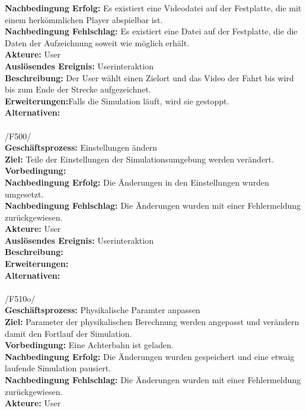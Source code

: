 \textbf{Nachbedingung Erfolg:} Es existiert eine Videodatei auf der Festplatte, die mit einem herkömmlichen Player abspielbar ist.\\
\textbf{Nachbedingung Fehlschlag:} Es existiert eine Datei auf der Festplatte, die die Daten der Aufzeichnung soweit wie möglich erhält.\\
\textbf{Akteure:} User\\
\textbf{Auslösendes Ereignis:} Userinteraktion\\
\textbf{Beschreibung:}  Der User wählt einen Zielort und das Video der Fahrt bis wird bis zum Ende der Strecke aufgezeichnet.\\
\textbf{Erweiterungen:}Falls die Simulation läuft, wird sie gestoppt.\\ 
\textbf{Alternativen:}\\
\\
/F500/\\
\textbf{Geschäftsprozess:} Einstellungen ändern\\
\textbf{Ziel:} Teile der Einstellungen der Simulationsumgebung werden verändert.\\
\textbf{Vorbedingung:} \\
\textbf{Nachbedingung Erfolg:} Die Änderungen in den Einstellungen wurden umgesetzt.\\
\textbf{Nachbedingung Fehlschlag:}  Die Änderungen wurden mit einer Fehlermeldung zurückgewiesen.\\
\textbf{Akteure:} User\\
\textbf{Auslösendes Ereignis:} Userinteraktion\\
\textbf{Beschreibung:} \\
\textbf{Erweiterungen:}\\
\textbf{Alternativen:}\\
\\
/F510o/\\
\textbf{Geschäftsprozess:} Physikalische Paramter anpassen\\
\textbf{Ziel:} Parameter der physikalischen Berechnung werden angepasst und verändern damit den Fortlauf der Simulation.\\
\textbf{Vorbedingung:} Eine Achterbahn ist geladen.\\
\textbf{Nachbedingung Erfolg:} Die Änderungen wurden gespeichert und eine etwaig laufende Simulation pausiert.\\
\textbf{Nachbedingung Fehlschlag:} Die Änderungen wurden mit einer Fehlermeldung zurückgewiesen.\\
\textbf{Akteure:} User\\
